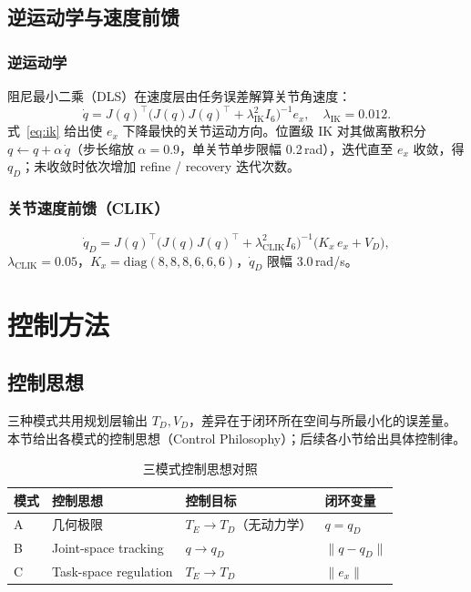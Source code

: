 \documentclass[UTF8, a4paper, 12pt]{ctexart}
\begin{document}
\subsection{逆运动学与速度前馈}

\subsubsection{逆运动学}

阻尼最小二乘（DLS）在速度层由任务误差解算关节角速度：
\begin{equation}
    \dot{q} = J(q)^\top \bigl(J(q)J(q)^\top + \lambda_{\mathrm{IK}}^2 I_6\bigr)^{-1} e_x,
    \quad \lambda_{\mathrm{IK}}=0.012.
    \label{eq:ik}
\end{equation}
式~\eqref{eq:ik} 给出使 $e_x$ 下降最快的关节运动方向。位置级 IK 对其做离散积分
$q \leftarrow q + \alpha\,\dot{q}$（步长缩放 $\alpha=0.9$，单关节单步限幅 0.2\,rad），迭代直至 $e_x$ 收敛，得 $q_D$；未收敛时依次增加 refine / recovery 迭代次数。

\subsubsection{关节速度前馈（CLIK）}

\begin{equation}
    \dot{q}_D = J(q)^\top \bigl(J(q)J(q)^\top + \lambda_{\mathrm{CLIK}}^2 I_6\bigr)^{-1}
    \bigl(K_x\, e_x + V_D\bigr),
    \label{eq:clik}
\end{equation}
$\lambda_{\mathrm{CLIK}}=0.05$，$K_x=\mathrm{diag}(8,8,8,6,6,6)$，$\dot{q}_D$ 限幅 3.0\,rad/s。

\section{控制方法}
\label{sec:control}

\subsection{控制思想}
\label{sec:control-philosophy}

三种模式共用规划层输出 $T_D,V_D$，差异在于闭环所在空间与所最小化的误差量。本节给出各模式的控制思想（Control Philosophy）；后续各小节给出具体控制律。

\begin{table}[H]
  \centering
  \caption{三模式控制思想对照}
  \label{tab:control-philosophy}
  \renewcommand{\arraystretch}{1.25}
  \begin{tabular}{@{} l l l l @{}}
    \toprule
    模式 & 控制思想 & 控制目标 & 闭环变量 \\
    \midrule
    A & 几何极限 & $T_E \rightarrow T_D$（无动力学） & $q = q_D$ \\
    B & Joint-space tracking & $q \rightarrow q_D$ & $\|q - q_D\|$ \\
    C & Task-space regulation & $T_E \rightarrow T_D$ & $\|e_x\|$ \\
    \bottomrule
  \end{tabular}
\end{table}
\end{document}
